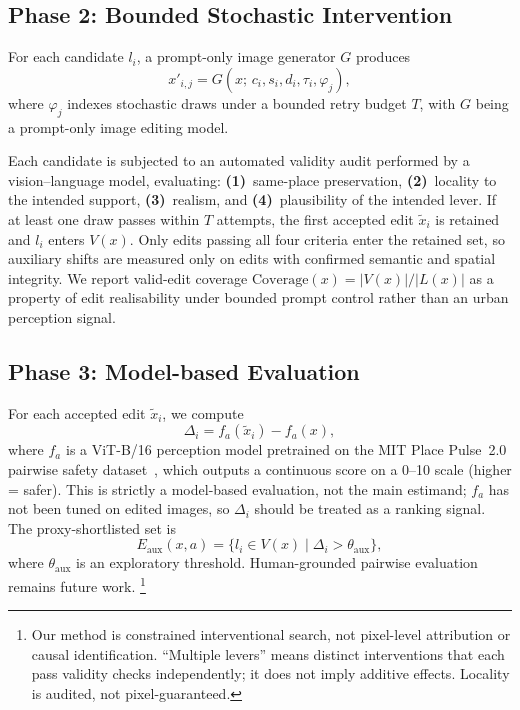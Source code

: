 \subsection{Phase 2: Bounded Stochastic Intervention}

For each candidate $l_i$, a prompt-only image generator $G$ produces
\begin{equation}
  x'_{i,j} = G(x;\, c_i, s_i, d_i, \tau_i, \varphi_j),
\end{equation}
where $\varphi_j$ indexes stochastic draws under a bounded retry budget
$T$, with $G$ being a prompt-only image editing model.

Each candidate is subjected to an automated validity audit performed by
a vision--language model,
evaluating: \textbf{(1)}~same-place preservation,
\textbf{(2)}~locality to the intended support, \textbf{(3)}~realism,
and \textbf{(4)}~plausibility of the intended lever. If at least one
draw passes within $T$ attempts, the first accepted edit $\tilde{x}_i$
is retained and $l_i$ enters $V(x)$. Only edits passing all four
criteria enter the retained set, so auxiliary shifts are measured only
on edits with confirmed semantic and spatial integrity.
We report valid-edit coverage
$\mathrm{Coverage}(x) = |V(x)| / |L(x)|$ as a property of edit
realisability under bounded prompt control rather than an urban
perception signal.

\subsection{Phase 3: Model-based Evaluation}

For each accepted edit $\tilde{x}_i$, we compute
\begin{equation}
  \Delta_i = f_a(\tilde{x}_i) - f_a(x),
\end{equation}
where $f_a$ is a ViT-B/16 perception model pretrained on the MIT Place
Pulse~2.0 pairwise safety dataset~\cite{hou2024globalstreetscapes},
which outputs a continuous score on a 0--10 scale (higher = safer).
This is strictly a model-based evaluation, not the main estimand; $f_a$ has
not been tuned on edited images, so $\Delta_i$ should be treated as
a ranking signal. The proxy-shortlisted set is
\begin{equation}
  E_{\mathrm{aux}}(x,a) = \{ l_i \in V(x) \mid \Delta_i >
  \theta_{\mathrm{aux}} \},
\end{equation}
where $\theta_{\mathrm{aux}}$ is an exploratory threshold.
Human-grounded pairwise evaluation remains future
work.%
\footnote{Our method is constrained interventional search, not
pixel-level attribution or causal identification. ``Multiple levers''
means distinct interventions that each pass validity checks
independently; it does not imply additive effects. Locality is audited,
not pixel-guaranteed.}
